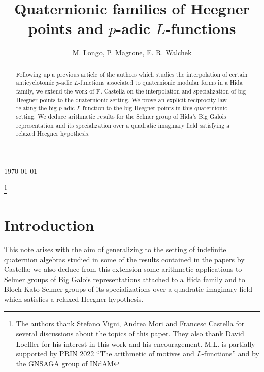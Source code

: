 \documentclass[a4paper,11pt]{amsart}
\numberwithin{equation}{section}
\theoremstyle{plain}
\theoremstyle{definition}
\theoremstyle{remark}
\begin{document}


\title[Quaternionic families of Heegner points and $p$-adic $L$-functions]{Quaternionic families of Heegner points and $p$-adic $L$-functions}
\today
\date{}
\author{M. Longo, P. Magrone, E. R. Walchek}

\thanks{The authors thank Stefano Vigni, Andrea Mori and Francesc Castella  for several discussions 
about the topics of this paper. They also thank David Loeffler for his interest in this work and his encouragement. M.L. is partially supported by PRIN 2022 ``The arithmetic of motives and $L$-functions'' and by the GNSAGA group of INdAM}

\begin{abstract}
Following up a previous article of the authors which studies the interpolation of certain anticyclotomic $p$-adic $L$-functions associated to quaternionic modular forms in a Hida family, we extend the work of F. Castella on the interpolation and specialization of big Heegner points to the quaternionic setting. We prove an explicit reciprocity law relating the big $p$-adic $L$-function to the big Heegner points in this quaternionic setting. We deduce arithmetic results for 
the Selmer group of Hida's Big Galois representation and its specialization over a quadratic imaginary field satisfying a relaxed Heegner hypothesis. 
\end{abstract}

\address{Dipartimento di Matematica, Universit\`a di Padova, Via Trieste 63, 35121 Padova, Italy}

\subjclass[2010]{}


\maketitle


\section{Introduction}\label{Intro}

This note arises with the aim of generalizing to the setting of indefinite quaternion algebras studied in \cite{LV-MM} some of the results contained in the papers \cite{Castella-MathAnn, Castella} by Castella; we also deduce from this extension some arithmetic applications to Selmer groups of Big Galois representations attached to a Hida family and to Bloch-Kato Selmer groups of its specializations 
over a quadratic imaginary field which satisfies a relaxed Heegner hypothesis. 
\end{document}
